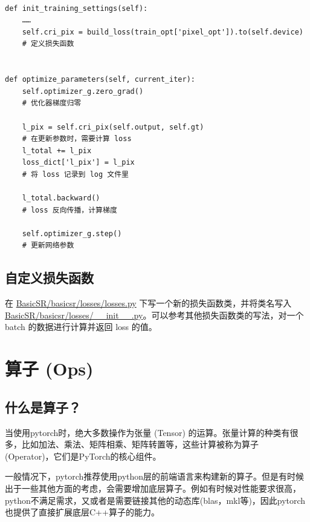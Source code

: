 \documentclass[../main.tex]{subfiles}
\begin{document}
\begin{verbatim}

def init_training_settings(self):
    ……
    self.cri_pix = build_loss(train_opt['pixel_opt']).to(self.device)
    # 定义损失函数


def optimize_parameters(self, current_iter):
    self.optimizer_g.zero_grad()
    # 优化器梯度归零

    l_pix = self.cri_pix(self.output, self.gt)
    # 在更新参数时，需要计算 loss
    l_total += l_pix
    loss_dict['l_pix'] = l_pix
    # 将 loss 记录到 log 文件里

    l_total.backward()
    # loss 反向传播，计算梯度

    self.optimizer_g.step()
    # 更新网络参数
\end{verbatim}

\subsection{自定义损失函数}

在 \href{https://github.com/XPixelGroup/BasicSR/blob/master/basicsr/losses/losses.py}{BasicSR/basicsr/losses/losses.py} 下写一个新的损失函数类，并将类名写入\href{https://github.com/XPixelGroup/BasicSR/blob/master/basicsr/losses/__init__.py}{BasicSR/basicsr/losses/\_\_init\_\_.py}。可以参考其他损失函数类的写法，对一个 batch 的数据进行计算并返回 loss 的值。



\section{算子 (Ops)}\label{code_structure:ops}

\subsection{什么是算子？}

当使用pytorch时，绝大多数操作为张量 (Tensor) 的运算。张量计算的种类有很多，比如加法、乘法、矩阵相乘、矩阵转置等，这些计算被称为算子 (Operator)，它们是PyTorch的核心组件。

一般情况下，pytorch推荐使用python层的前端语言来构建新的算子。但是有时候出于一些其他方面的考虑，会需要增加底层算子。例如有时候对性能要求很高，python不满足需求，又或者是需要链接其他的动态库(blas，mkl等)，因此pytorch也提供了直接扩展底层C++算子的能力。
\end{document}

